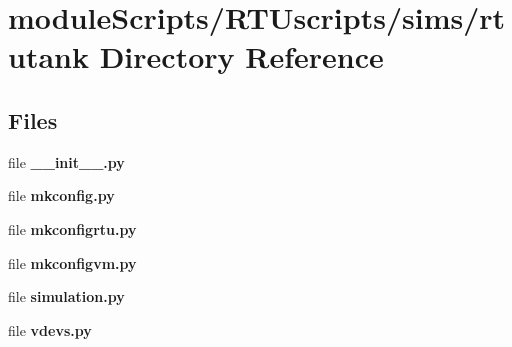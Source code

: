 \section{module\+Scripts/\+R\+T\+Uscripts/sims/rtutank Directory Reference}
\label{dir_e2a02afeece371e6d5b46037fd682cfb}
\subsection*{Files}
\begin{DoxyCompactItemize}
\item 
file {\bf \+\_\+\+\_\+init\+\_\+\+\_\+.\+py}
\item 
file {\bf mkconfig.\+py}
\item 
file {\bf mkconfigrtu.\+py}
\item 
file {\bf mkconfigvm.\+py}
\item 
file {\bf simulation.\+py}
\item 
file {\bf vdevs.\+py}
\end{DoxyCompactItemize}
